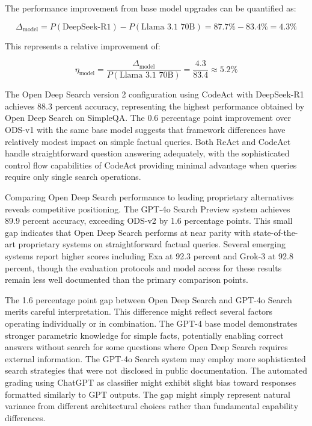 The performance improvement from base model upgrades can be quantified as:

\begin{equation}
\Delta_{\text{model}} = P(\text{DeepSeek-R1}) - P(\text{Llama 3.1 70B}) = 87.7\% - 83.4\% = 4.3\%
\label{eq:model_gain}
\end{equation}

This represents a relative improvement of:

\begin{equation}
\eta_{\text{model}} = \frac{\Delta_{\text{model}}}{P(\text{Llama 3.1 70B})} = \frac{4.3}{83.4} \approx 5.2\%
\label{eq:relative_improvement}
\end{equation}

The Open Deep Search version 2 configuration using CodeAct with DeepSeek-R1 achieves 88.3 percent accuracy, representing the highest performance obtained by Open Deep Search on SimpleQA. The 0.6 percentage point improvement over ODS-v1 with the same base model suggests that framework differences have relatively modest impact on simple factual queries. Both ReAct and CodeAct handle straightforward question answering adequately, with the sophisticated control flow capabilities of CodeAct providing minimal advantage when queries require only single search operations.

Comparing Open Deep Search performance to leading proprietary alternatives reveals competitive positioning. The GPT-4o Search Preview system achieves 89.9 percent accuracy, exceeding ODS-v2 by 1.6 percentage points. This small gap indicates that Open Deep Search performs at near parity with state-of-the-art proprietary systems on straightforward factual queries. Several emerging systems report higher scores including Exa at 92.3 percent and Grok-3 at 92.8 percent, though the evaluation protocols and model access for these results remain less well documented than the primary comparison points.

The 1.6 percentage point gap between Open Deep Search and GPT-4o Search merits careful interpretation. This difference might reflect several factors operating individually or in combination. The GPT-4 base model demonstrates stronger parametric knowledge for simple facts, potentially enabling correct answers without search for some questions where Open Deep Search requires external information. The GPT-4o Search system may employ more sophisticated search strategies that were not disclosed in public documentation. The automated grading using ChatGPT as classifier might exhibit slight bias toward responses formatted similarly to GPT outputs. The gap might simply represent natural variance from different architectural choices rather than fundamental capability differences.


